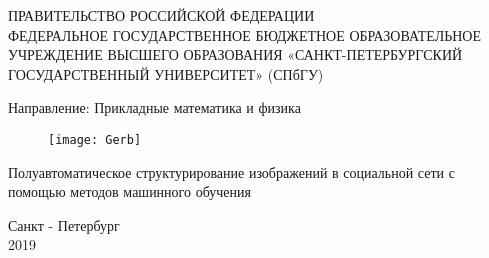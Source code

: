 \begin{titlepage}
		
\thispagestyle{empty}
		
  \begin{center}
  
   \large
   ПРАВИТЕЛЬСТВО РОССИЙСКОЙ ФЕДЕРАЦИИ \\
   
   \vspace{0.25cm}
   ФЕДЕРАЛЬНОЕ ГОСУДАРСТВЕННОЕ БЮДЖЕТНОЕ
   ОБРАЗОВАТЕЛЬНОЕ УЧРЕЖДЕНИЕ ВЫСШЕГО ОБРАЗОВАНИЯ 
   «САНКТ-ПЕТЕРБУРГСКИЙ ГОСУДАРСТВЕННЫЙ УНИВЕРСИТЕТ» 
   (СПбГУ)
   
   \vspace{0.25cm}
   Направление: Прикладные математика и физика
   
   \vfill
   
   \begin{figure}[h!]
   	\begin{center}
   		\texttt{[image: Gerb]}
   	\end{center}
   \end{figure}


    {\LARGE Полуавтоматическое структурирование изображений в социальной сети с помощью методов машинного обучения}
  \bigskip


\end{center}

\vfill

\newlength{\ML}


\begin{center}
    Санкт - Петербург \\
    2019
\end{center}

\end{titlepage}
